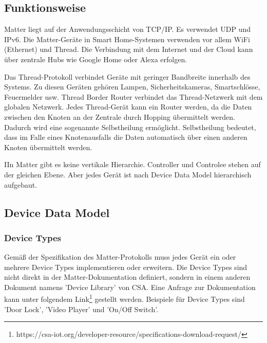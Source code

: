 \documentclass[12pt, a4paper]{article}
\begin{document}
\subsection{Funktionsweise}
\par Matter liegt auf der Anwendungsschicht von TCP/IP. Es verwendet UDP und IPv6. Die Matter-Geräte in Smart Home-Systemen verwenden vor allem WiFi (Ethernet) und Thread. Die Verbindung mit dem Internet und der Cloud kann über zentrale Hubs wie Google Home oder Alexa erfolgen.
\par Das Thread-Protokoll verbindet Geräte mit geringer Bandbreite innerhalb des Systems. Zu diesen Geräten gehören Lampen, Sicherheitskameras, Smartschlösse, Feuermelder usw. Thread Border Router verbindet das Thread-Netzwerk mit dem globalen Netzwerk. Jedes Thread-Gerät kann ein Router werden, da die Daten zwischen den Knoten an der Zentrale durch Hopping übermittelt werden. Dadurch wird eine sogenannte Selbstheilung ermöglicht. Selbstheilung bedeutet, dass im Falle eines Knotenausfalls die Daten automatisch über einen anderen Knoten übermittelt werden.
\par IIn Matter gibt es keine vertikale Hierarchie. Controller und Controlee stehen auf der gleichen Ebene. Aber jedes Gerät ist nach Device Data Model hierarchisch aufgebaut.


\subsection{Device Data Model}
\subsubsection{Device Types}
\par Gemäß der Spezifikation des Matter-Protokolls muss jedes Gerät ein oder mehrere Device Types implementieren oder erweitern. Die Device Types sind nicht direkt in der Matter-Dokumentation definiert, sondern in einem anderen Dokument namens 'Device Library' von CSA. Eine Anfrage zur Dokumentation kann unter folgendem Link\footnote[6]{https://csa-iot.org/developer-resource/specifications-download-request/} gestellt werden. Beispiele für Device Types sind 'Door Lock', 'Video Player' und 'On/Off Switch'.
\end{document}
